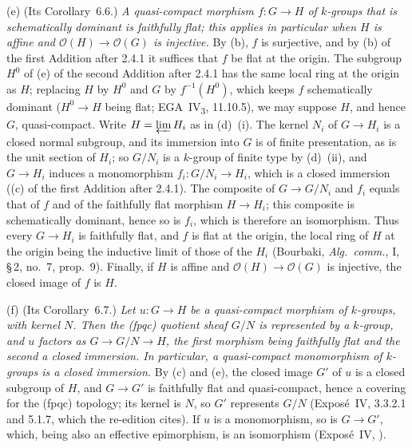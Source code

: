 \label{cor:sga3-VIA-6.6}%
(e) (Its Corollary~6.6.) \emph{A quasi-compact morphism \(f\colon G\to H\) of \(k\)-groups that is
schematically dominant is faithfully flat; this applies in particular when \(H\) is affine and
\(\mathcal O(H)\to\mathcal O(G)\) is injective.} By (b), \(f\) is surjective, and by (b) of the first
Addition after 2.4.1 it suffices that \(f\) be flat at the origin. The subgroup \(H^0\) of (e) of the
second Addition after 2.4.1 has the same local ring at the origin as \(H\); replacing \(H\) by \(H^0\)
and \(G\) by \(f^{-1}(H^0)\), which keeps \(f\) schematically dominant (\(H^0\to H\) being flat;
EGA~IV\textsubscript{3}, 11.10.5), we may suppose \(H\), and hence \(G\), quasi-compact. Write
\(H=\varprojlim H_i\) as in (d)~(i). The kernel \(N_i\) of \(G\to H_i\) is a closed normal subgroup,
and its immersion into \(G\) is of finite presentation, as is the unit section of \(H_i\); so
\(G/N_i\) is a \(k\)-group of finite type by (d)~(ii), and \(G\to H_i\) induces a monomorphism
\(f_i\colon G/N_i\to H_i\), which is a closed immersion ((c) of the first Addition after 2.4.1). The
composite of \(G\to G/N_i\) and \(f_i\) equals that of \(f\) and of the faithfully flat morphism
\(H\to H_i\); this composite is schematically dominant, hence so is \(f_i\), which is therefore an
isomorphism. Thus every \(G\to H_i\) is faithfully flat, and \(f\) is flat at the origin, the local
ring of \(H\) at the origin being the inductive limit of those of the \(H_i\) (Bourbaki, \emph{Alg.\
comm.}, I, \S\,2, no.~7, prop.~9). Finally, if \(H\) is affine and \(\mathcal O(H)\to\mathcal O(G)\) is
injective, the closed image of \(f\) is \(H\).

(f) (Its Corollary~6.7.) \emph{Let \(u\colon G\to H\) be a quasi-compact morphism of \(k\)-groups,
with kernel \(N\). Then the \textup{(}fpqc\textup{)} quotient sheaf \(G/N\) is represented by a
\(k\)-group, and \(u\) factors as \(G\to G/N\to H\), the first morphism being faithfully flat and the
second a closed immersion. In particular, a quasi-compact monomorphism of \(k\)-groups is a closed
immersion.} By (c) and (e), the closed image \(G'\) of \(u\) is a closed subgroup of \(H\), and
\(G\to G'\) is faithfully flat and quasi-compact, hence a covering for the (fpqc) topology; its kernel
is \(N\), so \(G'\) represents \(G/N\) (Exposé~IV, 3.3.2.1 and 5.1.7, which the re-edition cites).
If \(u\) is a monomorphism, so is \(G\to G'\), which, being also an effective epimorphism, is an
isomorphism (Exposé~IV, \SGARefLink{sga3:iv:remark:1:14}{1.14}).

